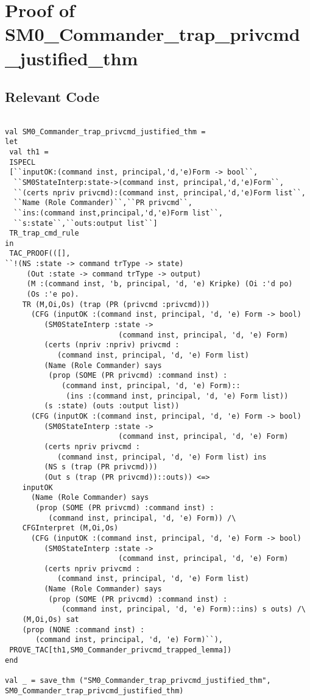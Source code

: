 \documentclass{report}
\begin{document}
\section{Proof of SM0_Commander_trap_privcmd_justified_thm}
\label{proof-2}

\subsection{Relevant Code}
\label{rel-code-2}
\begin{lstlisting}[frame=TBlr]

val SM0_Commander_trap_privcmd_justified_thm =
let
 val th1 =
 ISPECL
 [``inputOK:(command inst, principal,'d,'e)Form -> bool``,
  ``SM0StateInterp:state->(command inst, principal,'d,'e)Form``,
  ``(certs npriv privcmd):(command inst, principal,'d,'e)Form list``,
  ``Name (Role Commander)``,``PR privcmd``,
  ``ins:(command inst,principal,'d,'e)Form list``,
  ``s:state``,``outs:output list``]
 TR_trap_cmd_rule
in 
 TAC_PROOF(([],
``!(NS :state -> command trType -> state)
     (Out :state -> command trType -> output)
     (M :(command inst, 'b, principal, 'd, 'e) Kripke) (Oi :'d po)
     (Os :'e po).
    TR (M,Oi,Os) (trap (PR (privcmd :privcmd)))
      (CFG (inputOK :(command inst, principal, 'd, 'e) Form -> bool)
         (SM0StateInterp :state ->
                          (command inst, principal, 'd, 'e) Form)
         (certs (npriv :npriv) privcmd :
            (command inst, principal, 'd, 'e) Form list)
         (Name (Role Commander) says
          (prop (SOME (PR privcmd) :command inst) :
             (command inst, principal, 'd, 'e) Form)::
              (ins :(command inst, principal, 'd, 'e) Form list))
         (s :state) (outs :output list))
      (CFG (inputOK :(command inst, principal, 'd, 'e) Form -> bool)
         (SM0StateInterp :state ->
                          (command inst, principal, 'd, 'e) Form)
         (certs npriv privcmd :
            (command inst, principal, 'd, 'e) Form list) ins
         (NS s (trap (PR privcmd)))
         (Out s (trap (PR privcmd))::outs)) <=>
    inputOK
      (Name (Role Commander) says
       (prop (SOME (PR privcmd) :command inst) :
          (command inst, principal, 'd, 'e) Form)) /\
    CFGInterpret (M,Oi,Os)
      (CFG (inputOK :(command inst, principal, 'd, 'e) Form -> bool)
         (SM0StateInterp :state ->
                          (command inst, principal, 'd, 'e) Form)
         (certs npriv privcmd :
            (command inst, principal, 'd, 'e) Form list)
         (Name (Role Commander) says
          (prop (SOME (PR privcmd) :command inst) :
             (command inst, principal, 'd, 'e) Form)::ins) s outs) /\
    (M,Oi,Os) sat
    (prop (NONE :command inst) :
       (command inst, principal, 'd, 'e) Form)``),
 PROVE_TAC[th1,SM0_Commander_privcmd_trapped_lemma])
end

val _ = save_thm ("SM0_Commander_trap_privcmd_justified_thm",
SM0_Commander_trap_privcmd_justified_thm)


\end{lstlisting}
\end{document}
